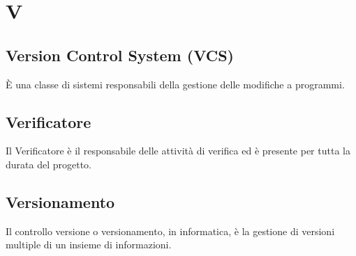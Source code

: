 \section{V}
	\subsection{Version Control System (VCS)}
		È una classe di sistemi responsabili della gestione delle modifiche a programmi. 
	\subsection{Verificatore} 
		Il Verificatore è il responsabile delle attività di verifica ed è presente per tutta la durata del progetto.
	\subsection{Versionamento} 
		Il controllo versione o versionamento, in informatica, è la gestione di versioni multiple di un insieme di informazioni. 
